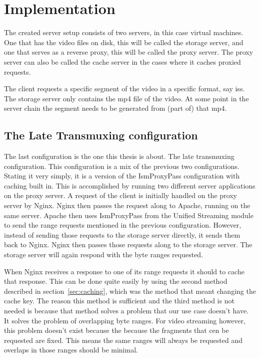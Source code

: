 \documentclass[twoside,openright]{uva-bachelor-thesis}
\begin{document}
\chapter{Implementation}
The created server setup consists of two servers, in this case virtual machines.
One that has the video files on disk, this will be called the storage server,
and one that serves as a reverse proxy, this will be called the proxy server.
The proxy server can also be called the cache server in the cases where it
caches proxied requests.

The client requests a specific segment of the video in a specific format, say
\gls{iss}. The storage server only contains the mp4 file of the video. At some point
in the server chain the segment needs to be generated from (part of) that mp4.



\section{The Late Transmuxing configuration}
The last configuration is the one this thesis is about. The late transmuxing
configuration. This configuration is a mix of the previous two configurations.
Stating it very simply, it is a version of the IsmProxyPass configuration with
caching built in. This is accomplished by running two different server
applications on the proxy server. A request of the client is initially handled
on the proxy server by Nginx. Nginx then passes the request along to Apache,
running on the same server. Apache then uses IsmProxyPass from the Unified
Streaming module to send the range requests mentioned in the previous
configuration.  However, instead of sending those requests to the storage server
directly, it sends them back to Nginx. Nginx then passes those requests along to
the storage server. The storage server will again respond with the byte ranges
requested.

When Nginx receives a response to one of its range requests it should to cache
that response. This can be done quite easily by using the second method
described in section~\vref{sec:caching}, which was the method that meant
changing the cache key. The reason this method is sufficient and the third
method is not needed is because that method solves a problem that our use case
doesn't have.  It solves the problem of overlapping byte ranges. For video
streaming however, this problem doesn't exist because the because the fragments
that cen be requested are fixed. This means the same ranges will always be
requested and overlaps in those ranges should be minimal.
\end{document}
